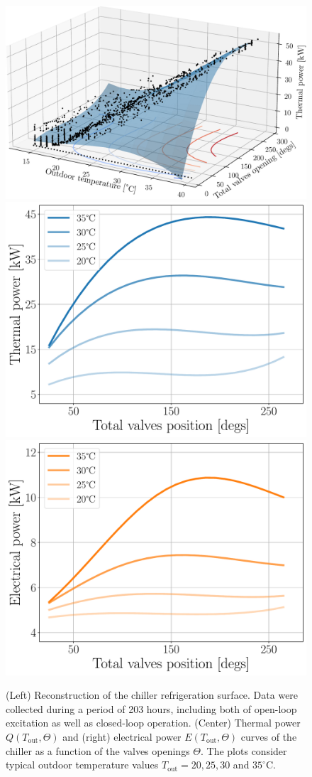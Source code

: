 \begin{figure}[!t]
	\centering
	\includegraphics[width=0.35\linewidth]{../images/chap3_thermal_surface.pdf} 
	\hspace{10pt}\includegraphics[width=0.26\linewidth]{../images/chap3_ther_energy.pdf}
	\includegraphics[width=0.26\linewidth]{../images/chap3_elec_energy.pdf}
	\caption{(Left) Reconstruction of the chiller refrigeration surface. Data were collected during a period of 203 hours, including both of open-loop excitation as well as closed-loop operation. (Center) Thermal power $Q(T_\text{out},\Theta)$ and (right) electrical power $E(T_\text{out},\Theta)$ curves of the chiller as a function of the valves openings $\Theta$. The plots consider typical outdoor temperature values $T_{\text{out}} = 20, 25, 30$ and $35^{\circ}$C.}
	\label{fig.thermalAndElectrical}
\end{figure}

